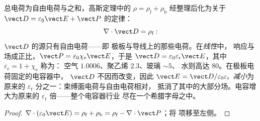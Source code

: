 \begin{proposition}[位移场]\label{prop:b3:electromagnetism-in-matter:displacement}
总电荷为自由电荷与之和，高斯定理中的 $\rho =
\rho_{\text{f}} + \rho_{\text{b}}$ 经整理后化为关于
\emph{} $\vect D = \varepsilon_0\vect E +
\vect P$ 的定律：
\[
\nabla\cdot\vect D = \rho_{\text{f}} :
\]
$\vect D$ 的源只有自由电荷——即
极板与导线上的那些电荷。在\emph{线性}中，
响应与场成正比，$\vect P = \varepsilon_0\chi_{\text{e}}\vect E$，于是
$\vect D = \varepsilon_0\varepsilon_{\text{r}}\vect E$，其中
$\varepsilon_{\text{r}} = 1 + \chi_{\text{e}}$ 称为\emph{}：
空气 $1.0006$、聚乙烯 $2.3$、玻璃 $\sim 5$、
水则高达 $80$。在极板电荷固定的电容器中，
$\vect D$ 不因而改变，因此 $\vect E =
\vect D/\varepsilon_0\varepsilon_{\text{r}}$ \emph{减小}为原来的
$\varepsilon_{\text{r}}$ 分之一：束缚面电荷与自由电荷相对，
抵消了其中的大部分场。电容增大为原来的
$\varepsilon_{\text{r}}$ 倍——整个电容器行业
尽在一个希腊字母之中。
\end{proposition}

\begin{proof}
$\nabla\cdot(\varepsilon_0\vect E) = \rho_{\text{f}} +
\rho_{\text{b}} = \rho_{\text{f}} - \nabla\cdot\vect P$；将
项移至左侧。
\end{proof}

